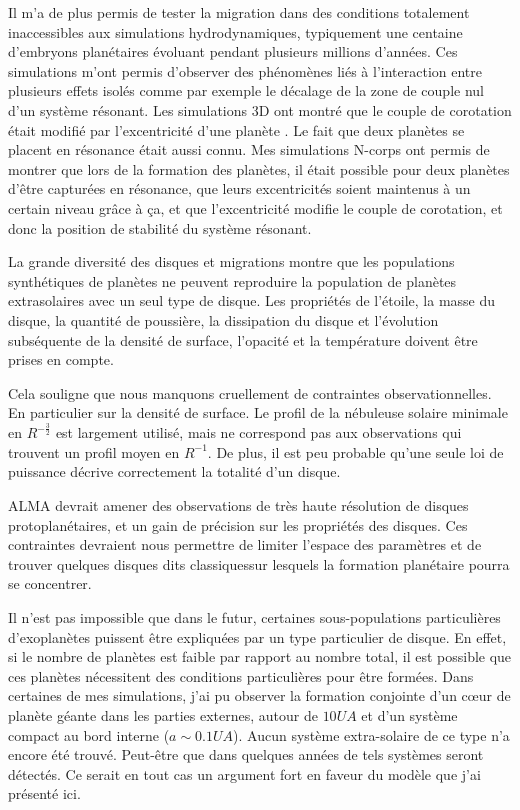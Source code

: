 Il m'a de plus permis de tester la migration dans des conditions totalement inaccessibles aux simulations hydrodynamiques, typiquement une centaine d'embryons planétaires évoluant pendant plusieurs millions d'années. Ces simulations m'ont permis d'observer des phénomènes liés à l'interaction entre plusieurs effets isolés comme par exemple le décalage de la zone de couple nul d'un système résonant. Les simulations 3D ont montré que le couple de corotation était modifié par l'excentricité d'une planète \citep{bitsch2010orbital}. Le fait que deux planètes se placent en résonance était aussi connu. Mes simulations N-corps ont permis de montrer que lors de la formation des planètes, il était possible pour deux planètes d'être capturées en résonance, que leurs excentricités soient maintenus à un certain niveau grâce à ça, et que l'excentricité modifie le couple de corotation, et donc la position de stabilité du système résonant\citep{cossou2013convergence}. 

\bigskip

La grande diversité des disques et migrations montre que les populations synthétiques de planètes ne peuvent reproduire la population de planètes extrasolaires avec un seul type de disque. Les propriétés de l'étoile, la masse du disque, la quantité de poussière, la dissipation du disque et l'évolution subséquente de la densité de surface, l'opacité et la température doivent être prises en compte. 

Cela souligne que nous manquons cruellement de contraintes observationnelles. En particulier sur la densité de surface. Le profil de la nébuleuse solaire minimale en $R^{-\frac{3}{2}}$ est largement utilisé, mais ne correspond pas aux observations qui trouvent un profil moyen en $R^{-1}$. De plus, il est peu probable qu'une seule loi de puissance décrive correctement la totalité d'un disque. 

ALMA devrait amener des observations de très haute résolution de disques protoplanétaires, et un gain de précision sur les propriétés des disques. Ces contraintes devraient nous permettre de limiter l'espace des paramètres et de trouver quelques disques dits \og classiques\fg sur lesquels la formation planétaire pourra se concentrer. 

Il n'est pas impossible que dans le futur, certaines sous-populations particulières d'exoplanètes puissent être expliquées par un type particulier de disque. En effet, si le nombre de planètes est faible par rapport au nombre total, il est possible que ces planètes nécessitent des conditions particulières pour être formées. Dans certaines de mes simulations, j'ai pu observer la formation conjointe d'un cœur de planète géante dans les parties externes, autour de $10\unit{UA}$ et d'un système compact au bord interne ($a\sim 0.1\unit{UA}$). Aucun système extra-solaire de ce type n'a encore été trouvé. Peut-être que dans quelques années de tels systèmes seront détectés. Ce serait en tout cas un argument fort en faveur du modèle que j'ai présenté ici. 

